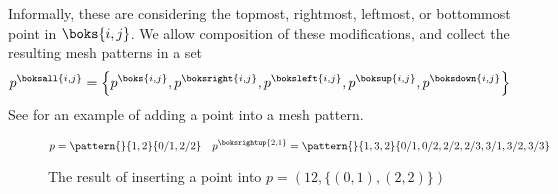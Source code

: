 Informally, these are considering the topmost, rightmost, leftmost, or bottommost point in
\(\boks{i,j}\). We allow composition of these modifications, and collect the resulting mesh patterns
in a set
\begin{equation*}
p^\boksall{i,j}=\left\{
p^\boks{i,j},
p^\boksright{i,j},
p^\boksleft{i,j},
p^\boksup{i,j},
p^\boksdown{i,j}\right\}
\end{equation*}
See  for an example of adding a point into a mesh pattern.

\begin{figure}
\begin{equation*}
p = \pattern{}{1,2}{0/1,2/2} \quad
p^\boksrightup{2,1}
= \pattern{}{1,3,2}{0/1,0/2,2/2,2/3,3/1,3/2,3/3}
\end{equation*}
\caption{The result of inserting a point into \(p=(12,\{(0,1),(2,2)\})\)}
\label{fig:addp}
\end{figure}

